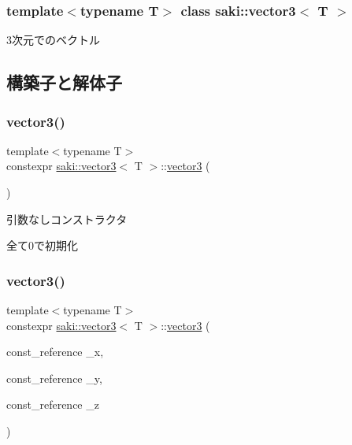 \subsubsection*{template$<$typename T$>$\newline
class saki\+::vector3$<$ T $>$}

3次元でのベクトル 

\subsection{構築子と解体子}
\mbox{\label{classsaki_1_1vector3_af8c424a90ac24c595f7f9f74c74a9db3}} 
\subsubsection{\texorpdfstring{vector3()}{vector3()}\hspace{0.1cm}{\footnotesize\ttfamily [1/4]}}
{\footnotesize\ttfamily template$<$typename T$>$ \\
constexpr \mbox{\hyperlink{classsaki_1_1vector3}{saki\+::vector3}}$<$ T $>$\+::\mbox{\hyperlink{classsaki_1_1vector3}{vector3}} (\begin{DoxyParamCaption}{ }\end{DoxyParamCaption})\hspace{0.3cm}{\ttfamily [inline]}}



引数なしコンストラクタ 

全て0で初期化 \mbox{\label{classsaki_1_1vector3_a2ac12ac3883e0d3eced195d84268e2dc}} 
\subsubsection{\texorpdfstring{vector3()}{vector3()}\hspace{0.1cm}{\footnotesize\ttfamily [2/4]}}
{\footnotesize\ttfamily template$<$typename T$>$ \\
constexpr \mbox{\hyperlink{classsaki_1_1vector3}{saki\+::vector3}}$<$ T $>$\+::\mbox{\hyperlink{classsaki_1_1vector3}{vector3}} (\begin{DoxyParamCaption}\item[{const\+\_\+reference}]{\+\_\+x,  }\item[{const\+\_\+reference}]{\+\_\+y,  }\item[{const\+\_\+reference}]{\+\_\+z }\end{DoxyParamCaption})\hspace{0.3cm}{\ttfamily [inline]}}



